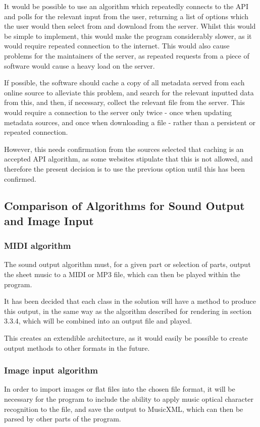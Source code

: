 It would be possible to use an algorithm which repeatedly connects to the API and polls for the relevant input from the user, returning a list of options which the user would then select from and download from the server. Whilst this would be simple to implement, this would make the program considerably slower, as it would require repeated connection to the internet. This would also cause problems for the maintainers of the server, as repeated requests from a piece of software would cause a heavy load on the server.

If possible, the software should cache a copy of all metadata served from each online source to alleviate this problem, and search for the relevant inputted data from this, and then, if necessary, collect the relevant file from the server. This would require a connection to the server only twice - once when updating metadata sources, and once when downloading a file - rather than a persistent or repeated connection. 

However, this needs confirmation from the sources selected that caching is an accepted API algorithm, as some websites stipulate that this is not allowed, and therefore the present decision is to use the previous option until this has been confirmed.

\subsection{Comparison of Algorithms for Sound Output and Image Input}
\subsubsection{MIDI algorithm}
The sound output algorithm must, for a given part or selection of parts, output the sheet music to a MIDI or MP3 file, which can then be played within the program. 

It has been decided that each class in the solution will have a method to produce this output, in the same way as the algorithm described for rendering in section 3.3.4, which will be combined into an output file and played.

This creates an extendible architecture, as it would easily be possible to create output methods to other formats in the future.

\subsubsection{Image input algorithm}
In order to import images or flat files into the chosen file format, it will be necessary for the program to include the ability to apply music optical character recognition to the file, and save the output to MusicXML, which can then be parsed by other parts of the program. 

